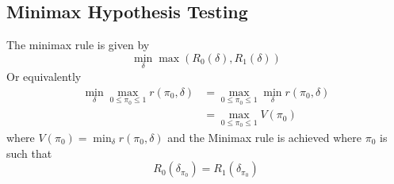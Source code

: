 \documentclass[a4paper,english,12pt]{article}
\begin{document}
\subsection{Minimax Hypothesis Testing}
The minimax rule is given by
\begin{equation}
\min_{\delta}\max({R_{0}(\delta),R_{1}(\delta)})
\end{equation}
Or equivalently
\begin{align}
\min_{\delta}\max_{0 \leq \pi_{0} \leq 1}r(\pi_{0},\delta)&= \max_{0 \leq \pi_{0} \leq 1}\min_{\delta}r(\pi_{0},\delta)\nonumber\\
														  &= \max_{0 \leq \pi_{0} \leq 1}V(\pi_{0})
\end{align}
where $V(\pi_{0})=\min_{\delta}r(\pi_{0},\delta)$ and the Minimax rule is achieved where $\pi_{0}$ is such that
\begin{equation} 
R_{0}(\delta_{\pi_{0}})=R_{1}(\delta_{\pi_{0}})
\end{equation}
\end{document}
